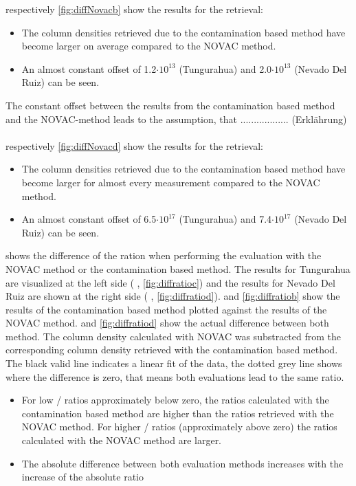 \documentclass  [
  paper    = a4,
  BCOR     = 10mm,
  twoside,
  fontsize = 12pt,
  fleqn,
  toc      = bibnumbered,
  toc      = listofnumbered,
  numbers  = noendperiod,
  headings = normal,
  listof   = leveldown,
  version  = 3.03
]                                       {scrreprt}
\begin{document}
	 respectively \ref{fig:diffNovacb} show the results for the   retrieval:
	\begin{itemize}
		\item The   column densities retrieved due to the contamination based method have become larger on average compared to the NOVAC method.
		\item An almost constant offset of 1.2$\cdot 10 ^{13}$ (Tungurahua) and 2.0$\cdot 10 ^{13}$ (Nevado Del Ruiz) can be seen.
	\end{itemize}
	The constant offset between the results from the contamination based method and the NOVAC-method leads to the assumption, that .................. (Erklährung)\\
	\\ 
	  respectively \ref{fig:diffNovacd} show the results for the   retrieval:
	\begin{itemize}
		\item The   column densities retrieved due to the contamination based method have become larger for almost every measurement compared to the NOVAC method.
		\item An almost constant offset of 6.5$\cdot 10 ^{17}$ (Tungurahua) and 7.4$\cdot 10 ^{17}$ (Nevado Del Ruiz) can be seen.
	\end{itemize}
 shows the difference of the ration when performing the evaluation with the NOVAC method or the contamination based method. The results for Tungurahua are visualized at the left side ( , \ref{fig:diffratioc}) and the results for Nevado Del Ruiz are shown at the right side  ( , \ref{fig:diffratiod}).  and \ref{fig:diffratiob} show the results of the contamination based method plotted against the results of the NOVAC method.   and \ref{fig:diffratiod} show the actual difference between both method. The column density calculated with NOVAC was substracted from the corresponding column density retrieved with the contamination based method. The black valid line indicates a linear fit of the data, the dotted grey line shows where the difference is zero, that means both evaluations lead to the same ratio.\\
\begin{itemize}
	\item For low /  ratios approximately below zero, the ratios calculated with the contamination based method are higher than the ratios retrieved with the NOVAC method. For higher /  ratios (approximately above zero) the ratios calculated with the NOVAC method are larger.
	\item The absolute difference between both evaluation methods increases with the increase of the absolute ratio
\end{itemize}
\end{document}
